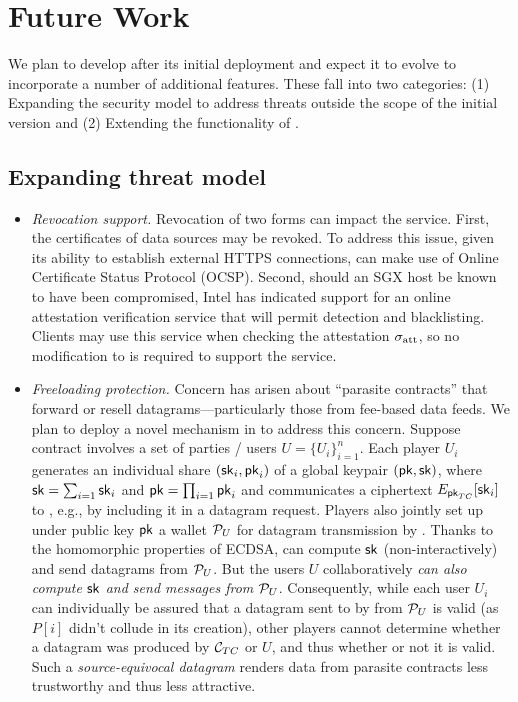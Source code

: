\section{Future Work}
\label{sec:future}

We plan to develop \tc after its initial deployment and expect it to evolve to incorporate a number of additional features. These fall into two categories: (1) Expanding the security model to address threats outside the scope of the initial version and (2) Extending the functionality of \tc.

\subsection{Expanding \tc threat model}

\begin{itemize}
\item{\em Revocation support.} Revocation of two forms can impact the \tc service. First, the certificates of data sources may be revoked. To address this issue, given its ability to establish external HTTPS connections, \tc can make use of Online Certificate Status Protocol (OCSP). Second, should an SGX host be known to have been compromised, Intel has indicated support for an online attestation verification service that will permit detection and blacklisting. Clients may use this service when checking the attestation ${\sigma_{\textrm{att}}}$, so no modification to \tc is required to support the service.
\item{\em Freeloading protection.} Concern has arisen about ``parasite contracts'' that forward or resell datagrams---particularly those from fee-based data feeds. We plan to deploy a novel mechanism in \tc to address this concern. Suppose contract \reqcont involves a set of parties / users $U = \{U_i\}_{i=1}^n$. Each player $U_i$ generates an individual share $({\sf sk}_i, {\sf pk}_i)$ of a global keypair $({\sf pk}, {\sf sk})$, where ${\sf sk} = \sum_{i=1} {\sf sk}_i$ and ${\sf pk} = \prod_{i=1} {\sf pk}_i$ and communicates a ciphertext $E_{{\sf pk}_{TC}}[{\sf sk}_i]$ to \tcont, e.g., by including it in a datagram request. Players also jointly set  up under public key ${\sf pk}$ a wallet ${\cal P}_U$ for datagram transmission by \tcont. Thanks to the homomorphic properties of ECDSA, \tcont can compute ${\sf sk}$ (non-interactively) and send datagrams from ${\cal P}_U$. But the users $U$ collaboratively \emph{can also compute ${\sf sk}$ and send messages from ${\cal P}_U$}. Consequently, while each user $U_i$ can individually be assured that a datagram sent to \reqcont by \tcont from ${\cal P}_U$ is valid (as $P[i]$ didn't collude in its creation), other players cannot determine whether a datagram was produced by ${\cal C}_{TC}$ or $U$, and thus whether or not it is valid. Such a \emph{source-equivocal datagram} renders data from parasite contracts less trustworthy and thus less attractive. 

\end{itemize}
